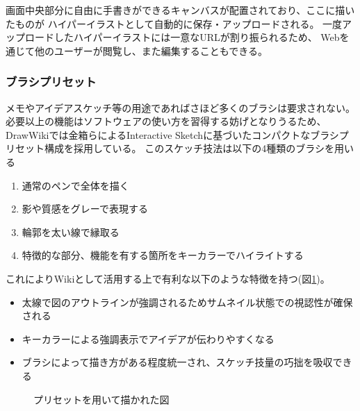 画面中央部分に自由に手書きができるキャンバスが配置されており、ここに描いたものが
ハイパーイラストとして自動的に保存・アップロードされる。
一度アップロードしたハイパーイラストには一意なURLが割り振られるため、
Webを通じて他のユーザーが閲覧し、また編集することもできる。

\subsubsection{ブラシプリセット}
メモやアイデアスケッチ等の用途であればさほど多くのブラシは要求されない。必要以上の機能はソフトウェアの使い方を習得する妨げとなりうるため、
DrawWikiでは金箱らによるInteractive Sketch\cite{130004638060}に基づいたコンパクトなブラシプリセット構成を採用している。
このスケッチ技法は以下の4種類のブラシを用いる
\begin{enumerate}
    \item 通常のペンで全体を描く
    \item 影や質感をグレーで表現する
    \item 輪郭を太い線で縁取る
    \item 特徴的な部分、機能を有する箇所をキーカラーでハイライトする
\end{enumerate}
これによりWikiとして活用する上で有利な以下のような特徴を持つ(図\ref{fig:interactivesketch})。
\begin{itemize}
    \item 太線で図のアウトラインが強調されるためサムネイル状態での視認性が確保される
    \item キーカラーによる強調表示でアイデアが伝わりやすくなる
    \item ブラシによって描き方がある程度統一され、スケッチ技量の巧拙を吸収できる
\end{itemize}

\begin{figure}[htbp]
    \begin{center}
         \end{center}
    \caption{プリセットを用いて描かれた図}
    \label{fig:interactivesketch}
\end{figure}

